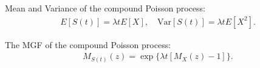 \documentclass[11pt]{beamer}
\begin{document}
\begin{frame}
\vspace{-2 cm}
Mean and Variance of the compound Poisson process:
\begin{eqnarray*}
E [S (t)] = \lambda t E [ X ] , \quad \mbox{Var} [S (t)] = \lambda t E [ X^2 ] .
\end{eqnarray*}



\vfill
\end{frame}
\begin{frame}
\vspace{-2.5 cm}
The MGF of the compound Poisson process:
\begin{eqnarray*}
M_{S (t)} (z) = \exp \{ \lambda t [ M_X (z) - 1 ] \} .
\end{eqnarray*}
\end{frame}
\end{document}

